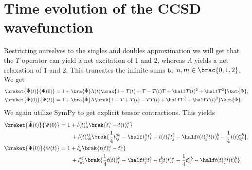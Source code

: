     \section{Time evolution of the CCSD wavefunction}
        Restricting ourselves to the singles and doubles approximation we will
        get that the $T$ operator can yield a net excitation of 1 and 2, whereas
        $\Lambda$ yields a net relaxation of 1 and 2. This truncates the
        infinite sums to $n, m \in \brac{0, 1, 2}$. We get
        \begin{align}
            \braket{\tilde{\Psi}(t)}{\Psi(0)}
            &= 1
            + \bra{\tilde{\Phi}}\Lambda(t)\brak{
                1 - T(t) + T - T(t)T
                + \half T(t)^2 + \half T^2
            }\ket{\Phi},
            \\
            \braket{\tilde{\Psi}(0)}{\Psi(t)}
            &= 1
            + \bra{\tilde{\Phi}}\Lambda\brak{
                1 - T + T(t) - TT(t)
                + \half T^2 + \half T(t)^2
            }\ket{\Phi}.
        \end{align}
        We again utilize SymPy\cite{sympy} to get explicit tensor contractions.
        This yields
        \begin{align}
            \braket{\tilde{\Psi}(t)}{\Psi(0)}
            &=
            1
            + l(t)^{i}_{a} \brak{
                t^{a}_{i} - t(t)^{a}_{i}
            }
            \nonumber \\
            &\qquad
            + l(t)^{ij}_{ab} \brak{
                \frac{1}{4}t^{ab}_{ij}
                - \half t^{a}_{j} t^{b}_{i}
                - t(t)^{a}_{i} t^{b}_{j}
                - \half t(t)^{a}_{j} t(t)^{b}_{i}
                - \frac{1}{4} t(t)^{ab}_{ij}
            },
            \\
            \braket{\tilde{\Psi}(0)}{\Psi(t)}
            &=
            1
            + l^{i}_{a} \brak{
                t(t)^{a}_{i}
                - t^{a}_{i}
            }
            \nonumber \\
            &\qquad
            + l^{ij}_{ab} \brak{
                \frac{1}{4}t(t)^{ab}_{ij}
                - \half t^{a}_{j} t^{b}_{i}
                - t^{b}_{j} t(t)^{a}_{i}
                - \frac{1}{4} t^{ab}_{ij}
                - \half t(t)^{a}_{j} t(t)^{b}_{i}
            }.
        \end{align}
